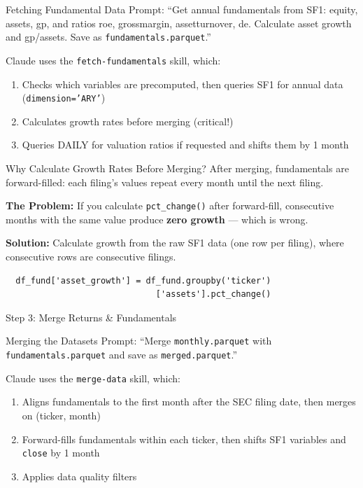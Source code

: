 \documentclass[aspectratio=169,t]{beamer}
\begin{document}
\begin{frame}{Fetching Fundamental Data}
\alert{Prompt:} ``Get annual fundamentals from SF1: equity, assets, gp, and ratios roe, grossmargin, assetturnover, de.  Calculate asset growth and gp/assets.  Save as \texttt{fundamentals.parquet}.''
\vspace{0.3cm}

Claude uses the \texttt{fetch-fundamentals} skill, which:
\begin{enumerate}
\item Checks which variables are precomputed, then queries SF1 for annual data (\texttt{dimension='ARY'})
\item Calculates growth rates \alert{before} merging (critical!)
\item Queries DAILY for valuation ratios if requested and shifts them by 1 month
\end{enumerate}
\end{frame}

\begin{frame}[fragile]{Why Calculate Growth Rates Before Merging?}
After merging, fundamentals are \alert{forward-filled}: each filing's values repeat every month until the next filing.
\vspace{0.3cm}

\textbf{The Problem:} If you calculate \texttt{pct\_change()} after forward-fill, consecutive months with the same value produce \textbf{zero growth} --- which is wrong.

\vspace{0.3cm}
\textbf{Solution:} Calculate growth from the raw SF1 data (one row per filing), where consecutive rows are consecutive filings.

\begin{verbatim}
  df_fund['asset_growth'] = df_fund.groupby('ticker')
                              ['assets'].pct_change()
\end{verbatim}
\end{frame}


\begin{frame}[c]
\centering
\Huge Step 3: Merge Returns \& Fundamentals
\end{frame}

\begin{frame}{Merging the Datasets}
\alert{Prompt:} ``Merge \texttt{monthly.parquet} with \texttt{fundamentals.parquet} and save as \texttt{merged.parquet}.''
\vspace{0.3cm}

Claude uses the \texttt{merge-data} skill, which:
\begin{enumerate}
\item Aligns fundamentals to the first month \alert{after} the SEC filing date, then merges on (ticker, month)
\item Forward-fills fundamentals within each ticker, then shifts SF1 variables and \texttt{close} by 1 month
\item Applies data quality filters
\end{enumerate}
\end{frame}
\end{document}

